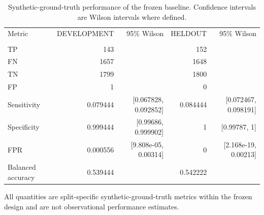 \begin{table}[htbp]
\centering
\caption{Synthetic-ground-truth performance of the frozen baseline. Confidence intervals are Wilson intervals where defined.}
\label{tab:synthetic_performance}
\small
\begin{tabular}{@{}lrrrr@{}}
\toprule
Metric & DEVELOPMENT & 95\% Wilson & HELDOUT & 95\% Wilson \\\\
\midrule
TP & 143 &  & 152 &  \\
FN & 1657 &  & 1648 &  \\
TN & 1799 &  & 1800 &  \\
FP & 1 &  & 0 &  \\
Sensitivity & 0.079444 & [0.067828, 0.092852] & 0.084444 & [0.072467, 0.098191] \\
Specificity & 0.999444 & [0.99686, 0.999902] & 1 & [0.99787, 1] \\
FPR & 0.000556 & [9.808e-05, 0.00314] & 0 & [2.168e-19, 0.00213] \\
Balanced accuracy & 0.539444 &  & 0.542222 &  \\
\bottomrule
\end{tabular}
\par\vspace{0.4em}\footnotesize All quantities are split-specific synthetic-ground-truth metrics within the frozen design and are not observational performance estimates.
\end{table}
